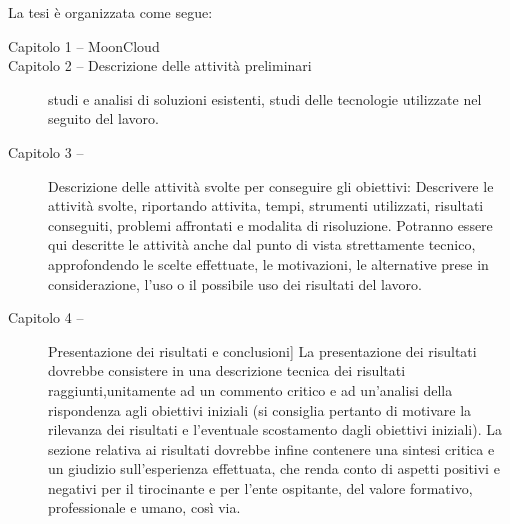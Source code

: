 La tesi \`e organizzata come segue:
\begin{description}
    \item[Capitolo 1 -- MoonCloud]
    \item[Capitolo 2 -- Descrizione delle attività preliminari] studi e analisi di soluzioni esistenti, studi delle tecnologie utilizzate
    nel seguito del lavoro.
    \item[Capitolo 3 -- ] Descrizione delle attività svolte per conseguire gli obiettivi: Descrivere le attività svolte, 
    riportando attivita, tempi, strumenti utilizzati, risultati conseguiti, problemi affrontati e modalita di risoluzione. 
    Potranno essere qui descritte le attività anche dal punto di vista strettamente tecnico, approfondendo le scelte effettuate, 
    le motivazioni, le alternative prese in considerazione, l’uso o il possibile uso dei risultati del lavoro.
    \item[Capitolo 4 -- ] Presentazione dei risultati e conclusioni] La presentazione dei risultati dovrebbe consistere in una 
    descrizione tecnica dei risultati raggiunti,unitamente ad un commento critico e ad un’analisi della rispondenza agli 
    obiettivi iniziali (si consiglia pertanto di motivare 
    la rilevanza dei risultati e l’eventuale scostamento dagli obiettivi iniziali). La sezione relativa ai risultati dovrebbe 
    infine contenere una sintesi critica e un giudizio sull’esperienza effettuata, che renda conto di aspetti positivi e negativi
    per il tirocinante e per l’ente ospitante, del valore formativo, professionale e umano, così via.
\end{description}




